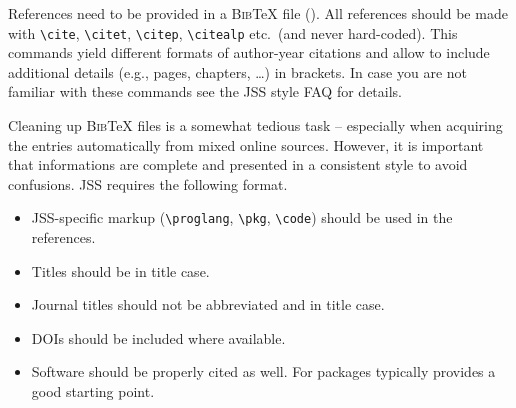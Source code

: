 \documentclass[article]{jss}
\begin{document}
\begin{appendix}
\begin{leftbar}
References need to be provided in a \textsc{Bib}{\TeX} file (). All
references should be made with \verb|\cite|, \verb|\citet|, \verb|\citep|,
\verb|\citealp| etc.\ (and never hard-coded). This commands yield different
formats of author-year citations and allow to include additional details (e.g.,
pages, chapters, \dots) in brackets. In case you are not familiar with these
commands see the JSS style FAQ for details.

Cleaning up \textsc{Bib}{\TeX} files is a somewhat tedious task -- especially
when acquiring the entries automatically from mixed online sources. However,
it is important that informations are complete and presented in a consistent
style to avoid confusions. JSS requires the following format.
\begin{itemize}
  \item JSS-specific markup (\verb|\proglang|, \verb|\pkg|, \verb|\code|) should
    be used in the references.
  \item Titles should be in title case.
  \item Journal titles should not be abbreviated and in title case.
  \item DOIs should be included where available.
  \item Software should be properly cited as well. For  packages
     typically provides a good starting point.
\end{itemize}
\end{leftbar}

\end{appendix}

\end{document}
